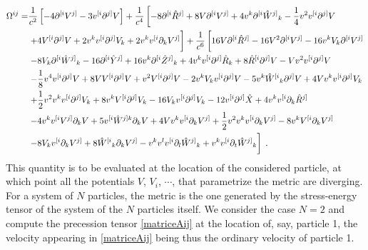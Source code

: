 \documentclass[
superscriptaddress,
preprint,
prd,tightenlines,showpacs,nofootinbib,
eqsecnum,
amsfonts,amsmath,amssymb]{revtex4-1}
\newcommand{\nn}{\nonumber}
\begin{document}
\begin{align}
\label{matriceAij}
	\Omega^{ij} =& \frac{1}{c^{2}} \left[ -4 \partial^{[i}V^{j]} -
3 v^{[i} \partial^{j]}V \right] + \frac{1}{c^{4}} 
\left[ -8 \partial^{[i}\hat{R}^{j]} + 8 V \partial^{[i}V^{j]} + 
4 v^{k} \partial^{[i}\hat{W}^{j]}{}_{k} -
\frac{1}{4} v^{2} v^{[i} \partial^{j]}V \right. \nn \\ 
	& \left. + 4 V^{[i} \partial^{j]}V + 2 v^{k} v^{[i} \partial^{j]}V_{k} + 
2 v^{k} v^{[i} \partial_{k}V^{j]} \vphantom{\frac{1}{2}} \right] + 
\frac{1}{c^{6}} \left[ \vphantom{\frac{1}{2}} 16 V \partial^{[i}\hat{R}^{j]} -
16 V^2 \partial^{[i}V^{j]} -16 v^{k} V_{k} \partial^{[i}V^{j]} \right. \nn \\ 
	& \left. -8 V_{k} \partial^{[i}\hat{W}^{j]}{}_{k} -
16 \partial^{[i}\hat{Y}^{j]} + 16 v^{k} \partial^{[i}\hat{Z}^{j]}{}_{k} + 
4 v^{k} v^{[i} \partial^{j]}\hat{R}_{k} + 8 \hat{R}^{[i} \partial^{j]}V - 
V v^{2} v^{[i} \partial^{j]}V \right. \nn \\ 
	& \left. -\frac{1}{8} v^{4} v^{[i} \partial^{j]}V + 
8 V V^{[i} \partial^{j]}V + v^{2} V^{[i} \partial^{j]}V -
2 v^{k} V_{k} v^{[i} \partial^{j]}V -5 v^{k} \hat{W}^{[i}{}_{k} \partial^{j]}V+ 
4 V v^{k} v^{[i} \partial^{j]}V_{k} \right. \nn \\ 
	& \left. + \frac{1}{2} v^{2} v^{k} v^{[i} \partial^{j]}V_{k} + 
8 v^{k} V^{[i} \partial^{j]}V_{k} -16 V_{k} v^{[i} \partial^{j]}V_{k} -
12 v^{[i} \partial^{j]}\hat{X} + 
4 v^{k} v^{[i} \partial_{k}\hat{R}^{j]} \right. \nn \\ 
	& \left. -4 v^{k} v^{[i} V^{j]} \partial_{k}V + 
5 v^{[i} \hat{W}^{j]k} \partial_{k}V + 4 V  v^{k} v^{[i} \partial_{k}V^{j]} + 
\frac{1}{2} v^{2} v^{k} v^{[i} \partial_{k}V^{j]} -
8 v^{k} V^{[i} \partial_{k}V^{j]} \right. \nn \\ 
	& \left. -8 V_{k} v^{[i} \partial_{k}V^{j]} + 
8 \hat{W}^{[i}{}_{k} \partial_{k}V^{j]} - 
v^{k} v^{l} v^{[i} \partial_{l}\hat{W}^{j]}{}_{k} + 
v^{k} v^{[i} \partial_{t}\hat{W}^{j]}{}_{k} \vphantom{\frac{1}{2}} \right] \; .
\end{align}
%
This quantity is to be evaluated at the location of the considered
particle, at which point all the potentials $V$, $V_i$, $\cdots$, that
parametrize the metric are diverging. For a system of $N$ particles,
the metric is the one generated by the stress-energy tensor of the
system of the $N$ particles itself. We consider the case $N=2$ and
compute the precession tensor \eqref{matriceAij} at the location of,
say, particle 1, the velocity appearing in \eqref{matriceAij} being
thus the ordinary velocity of particle 1.
\end{document}
